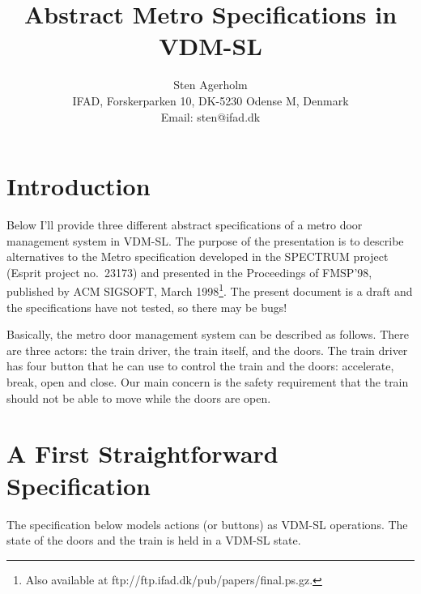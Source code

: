 \documentclass{article}
\title{Abstract Metro Specifications in VDM-SL}
\author{Sten Agerholm\\{\small IFAD, Forskerparken 10, DK-5230 Odense M,
  Denmark}\\{\small Email: sten@ifad.dk}}
\begin{document}
\maketitle

\section{Introduction}
Below I'll provide three different abstract specifications of a metro
door management system in VDM-SL. The purpose of the presentation is
to describe alternatives to the Metro specification developed in the
SPECTRUM project (Esprit project no.\ 23173) and presented in the
Proceedings of FMSP'98, published by ACM SIGSOFT, March
1998\footnote{Also available at {\small
    ftp://ftp.ifad.dk/pub/papers/final.ps.gz}.}. The present document
is a draft and the specifications have not tested, so there may be
bugs!

Basically, the metro door management system can be described as
follows. There are three actors: the train driver, the train itself,
and the doors. The train driver has four button that he can use to
control the train and the doors: accelerate, break, open and
close. Our main concern is the safety requirement that the train
should not be able to move while the doors are open.

\section{A First Straightforward Specification}
The specification below models actions (or buttons) as VDM-SL
operations. The state of the doors and the train is held in a VDM-SL state.


\end{document}

